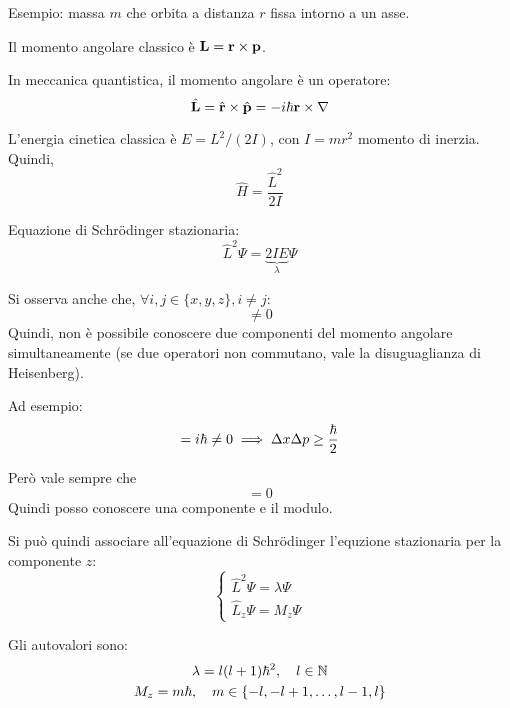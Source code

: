 Esempio: massa $m$ che orbita a distanza $r$ fissa intorno a un asse.

Il momento angolare classico è $\mathbf{L} = \mathbf{r} \times \mathbf{p}$.

In meccanica quantistica, il momento angolare è un operatore:
\begin{equation}
    \hat{\mathbf{L}} = \hat{\mathbf{r}} \times \hat{\mathbf{p}}
    = -i \hbar \mathbf{r} \times \nabla
\end{equation}

L'energia cinetica classica è $E = L^2 / (2 I)$, con $I = m r^2$ momento di inerzia.
Quindi,
\begin{equation}
    \hat{H} = \frac{\hat{L}^2}{2 I}
\end{equation}

Equazione di Schrödinger stazionaria:
\begin{equation}
    \hat{L}^2 \Psi = \underbrace{2 I E}_\lambda \Psi
\end{equation}

Si osserva anche che, $\forall i, j \in \{x, y, z\}, i \ne j$:
\begin{equation}
    [\hat{L}_i, \hat{L}_j] \ne 0
\end{equation}
Quindi, non è possibile conoscere due componenti del momento angolare simultaneamente (se due operatori non commutano, vale la disuguaglianza di Heisenberg).

Ad esempio:
\begin{equation}
    [\hat{\vt{x}}, \hat{\vt{p}}] = \im \hbar \ne 0
    \implies
    \Delta x \Delta p \ge \frac{\hbar}{2}
\end{equation}

Però vale sempre che
\begin{equation}
    [\hat{L}^2, \hat{L}_i] = 0
\end{equation}
Quindi posso conoscere una componente e il modulo.

Si può quindi associare all'equazione di Schrödinger l'equzione stazionaria per la componente $z$:
\begin{equation}
    \begin{cases}
        \hat{L}^2 \Psi = \lambda \Psi \\
        \hat{L}_z \Psi = M_z \Psi
    \end{cases}
\end{equation}

Gli autovalori sono:
\begin{gather}
    \lambda = l (l + 1) \hbar^2, \quad l \in \mathbb{N} \\
    M_z = m \hbar, \quad m \in \{-l, -l + 1, \ldots, l - 1, l\}
\end{gather}

